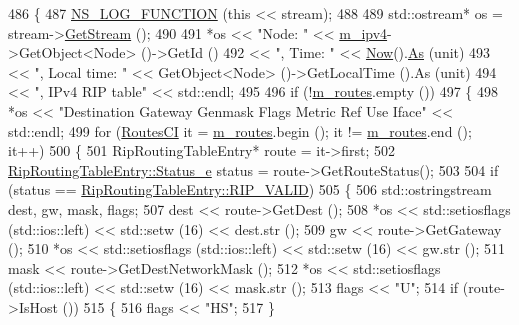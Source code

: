 \begin{DoxyCode}
486 \{
487   \hyperlink{log-macros-disabled_8h_a90b90d5bad1f39cb1b64923ea94c0761}{NS\_LOG\_FUNCTION} (\textcolor{keyword}{this} << stream);
488 
489   std::ostream* os = stream->\hyperlink{classns3_1_1OutputStreamWrapper_a0cf30a4188ab6fdae2b2ab74db11acc2}{GetStream} ();
490 
491   *os << \textcolor{stringliteral}{"Node: "} << \hyperlink{classns3_1_1Rip_a6e2c0e74d2fa8643d223db26621dd7f1}{m\_ipv4}->GetObject<Node> ()->GetId ()
492       << \textcolor{stringliteral}{", Time: "} << \hyperlink{group__simulator_gac3635e2e87f7ce316c89290ee1b01d0d}{Now}().\hyperlink{classns3_1_1Time_a0bb1110638ce9938248bd07865a328ab}{As} (unit)
493       << \textcolor{stringliteral}{", Local time: "} << GetObject<Node> ()->GetLocalTime ().As (unit)
494       << \textcolor{stringliteral}{", IPv4 RIP table"} << std::endl;
495 
496   \textcolor{keywordflow}{if} (!\hyperlink{classns3_1_1Rip_aea6c918ae311cd88fb2bfb714d6f9c30}{m\_routes}.empty ())
497     \{
498       *os << \textcolor{stringliteral}{"Destination     Gateway         Genmask         Flags Metric Ref    Use Iface"} << std::endl;
499       \textcolor{keywordflow}{for} (\hyperlink{classns3_1_1Rip_a20080eb47fbc0ac67e3eba1c61cbafcb}{RoutesCI} it = \hyperlink{classns3_1_1Rip_aea6c918ae311cd88fb2bfb714d6f9c30}{m\_routes}.begin (); it != \hyperlink{classns3_1_1Rip_aea6c918ae311cd88fb2bfb714d6f9c30}{m\_routes}.end (); it++)
500         \{
501           RipRoutingTableEntry* route = it->first;
502           \hyperlink{classns3_1_1RipRoutingTableEntry_a4326145be5c3027f2ddf9eb80b6127a4}{RipRoutingTableEntry::Status\_e} status = route->GetRouteStatus();
503 
504           \textcolor{keywordflow}{if} (status == \hyperlink{classns3_1_1RipRoutingTableEntry_a4326145be5c3027f2ddf9eb80b6127a4ac29e62da26c18bf4b9caa5224cfee895}{RipRoutingTableEntry::RIP\_VALID})
505             \{
506               std::ostringstream dest, gw, mask, flags;
507               dest << route->GetDest ();
508               *os << std::setiosflags (std::ios::left) << std::setw (16) << dest.str ();
509               gw << route->GetGateway ();
510               *os << std::setiosflags (std::ios::left) << std::setw (16) << gw.str ();
511               mask << route->GetDestNetworkMask ();
512               *os << std::setiosflags (std::ios::left) << std::setw (16) << mask.str ();
513               flags << \textcolor{stringliteral}{"U"};
514               \textcolor{keywordflow}{if} (route->IsHost ())
515                 \{
516                   flags << \textcolor{stringliteral}{"HS"};
517                 \}

\end{DoxyCode}
